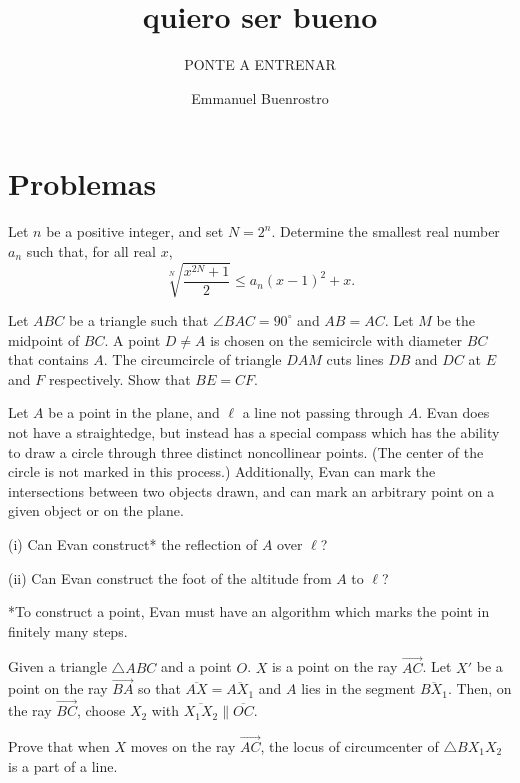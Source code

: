\documentclass[11pt]{scrartcl}
\title{quiero ser bueno }
\subtitle{PONTE A ENTRENAR}
\author{Emmanuel Buenrostro}
\begin{document}
\maketitle

\section{Problemas}
\begin{problem}[9026100911884959358]
Let $n$ be a positive integer, and set $N=2^{n}$. Determine the smallest real number $a_{n}$ such that, for all real $x$,
\[
\sqrt[N]{\frac{x^{2 N}+1}{2}} \leqslant a_{n}(x-1)^{2}+x .
\]
\end{problem}
\begin{problem}[6489054720541585180]
Let $ABC$ be a triangle such that $\angle BAC = 90^{\circ}$ and $AB = AC$. Let $M$ be the midpoint of $BC$. A point $D \neq A$ is chosen on the semicircle with diameter $BC$ that contains $A$. The circumcircle of triangle $DAM$ cuts lines $DB$ and $DC$ at $E$ and $F$ respectively. Show that $BE = CF$.
\end{problem}
\begin{problem}[70043882336455]
Let $A$ be a point in the plane, and $\ell$ a line not passing through $A$. Evan does not have a straightedge, but instead has a special compass which has the ability to draw a circle through three distinct noncollinear points. (The center of the circle is not marked in this process.) Additionally, Evan can mark the intersections between two objects drawn, and can mark an arbitrary point on a given object or on the plane.

(i) Can Evan construct* the reflection of $A$ over $\ell$?

(ii) Can Evan construct the foot of the altitude from $A$ to $\ell$?

*To construct a point, Evan must have an algorithm which marks the point in finitely many steps.
\end{problem}
\begin{problem}[1790114062253914451]
	Given a triangle $ \triangle{ABC} $ and a point $ O $. $ X $ is a point on the ray $ \overrightarrow{AC} $. Let $ X' $ be a point on the ray $ \overrightarrow{BA} $ so that $ \overline{AX} = \overline{AX_{1}} $ and $ A $ lies in the segment $ \overline{BX_{1}} $. Then, on the ray $ \overrightarrow{BC} $, choose $ X_{2} $ with $ \overline{X_{1}X_{2}} \parallel \overline{OC} $.

Prove that when $ X $ moves on the ray $ \overrightarrow{AC} $, the locus of circumcenter of $ \triangle{BX_{1}X_{2}} $ is a part of a line.
\end{problem}
\end{document}
